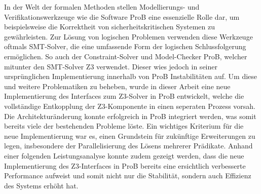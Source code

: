 
In der Welt der formalen Methoden stellen Modellierungs- und Verifikationswerkzeuge wie die Software ProB eine essenzielle Rolle dar,
um beispielsweise die Korrektheit von sicherheitskritischen Systemen zu gewährleisten.
Zur Lösung von logischen Problemen verwenden diese Werkzeuge oftmals SMT-Solver, die eine umfassende Form der logischen Schlussfolgerung ermöglichen.
So auch der Constraint-Solver und Model-Checker ProB, welcher mitunter den SMT-Solver Z3 verwendet.
Dieser wies jedoch in seiner ursprünglichen Implementierung innerhalb von ProB Instabilitäten auf.
Um diese und weitere Problematiken zu beheben, wurde in dieser Arbeit eine neue Implementierung des Interfaces zum Z3-Solver in ProB entwickelt, welche
die vollständige Entkopplung der Z3-Komponente in einen seperaten Prozess vorsah.
Die Architekturänderung konnte erfolgreich in ProB integriert werden, was somit bereits viele der bestehenden Probleme löste.
Ein wichtiges Kriterium für die neue Implementierung war es, einen Grundstein für zukünftige Erweiterungen zu legen, insbesondere der Parallelisierung des Lösens mehrerer Prädikate.
Anhand einer folgenden Leistungsanalyse konnte zudem gezeigt werden, dass die neue Implementierung des Z3-Interfaces
in ProB bereits eine ersichtlich verbesserte Performance aufweist und somit nicht nur die Stabilität, sondern auch Effizienz des Systems erhöht hat.
